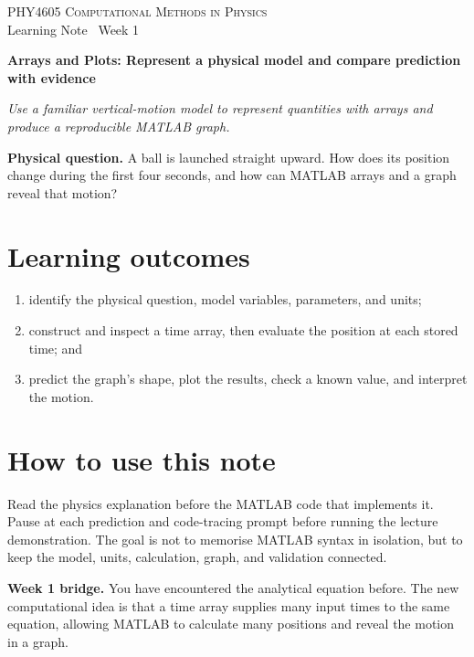 \documentclass[11pt,a4paper]{article}
\newcommand{\course}{PHY4605 Computational Methods in Physics}
\begin{document}
{\large\textsc{\course}}\\[-2pt]
{\small Learning Note \textbar\ Week 1}\par\vspace{4pt}
{\LARGE\bfseries Arrays and Plots: Represent a physical model and compare prediction with evidence}\par\vspace{3pt}
\textit{Use a familiar vertical-motion model to represent quantities with arrays and produce a reproducible MATLAB graph.}
\begin{keybox}\textbf{Physical question.} A ball is launched straight upward. How does its position change during the first four seconds, and how can MATLAB arrays and a graph reveal that motion?\end{keybox}
\section*{Learning outcomes}
\begin{enumerate}[nosep,leftmargin=5mm]
\item identify the physical question, model variables, parameters, and units;
\item construct and inspect a time array, then evaluate the position at each stored time; and
\item predict the graph's shape, plot the results, check a known value, and interpret the motion.
\end{enumerate}
\section*{How to use this note}
Read the physics explanation before the MATLAB code that implements it. Pause at each prediction and code-tracing prompt before running the lecture demonstration. The goal is not to memorise MATLAB syntax in isolation, but to keep the model, units, calculation, graph, and validation connected.
\begin{keybox}\textbf{Week 1 bridge.} You have encountered the analytical equation before. The new computational idea is that a time array supplies many input times to the same equation, allowing MATLAB to calculate many positions and reveal the motion in a graph.\end{keybox}
\end{document}
